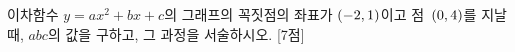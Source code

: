 이차함수 $y=ax^2+bx+c$의 그래프의 꼭짓점의 좌표가 $(-2{,}\mkern3mu 1)$이고 점~$(0{,}\mkern3mu 4)$를 지날 때, $abc$의 값을 구하고, 그 과정을 서술하시오.  \mbox{[7점]}
